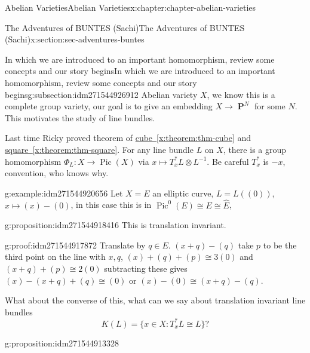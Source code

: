 \documentclass[oneside,10pt,]{book}
\numberwithin{equation}{section}
\DeclareMathOperator{\Pic}{Pic}
\DeclareMathOperator{\PP}{\mathbf{P}}
\begin{document}
\begin{chapterptx}{Abelian Varieties}{}{Abelian Varieties}{}{}{x:chapter:chapter-abelian-varieties}
\typeout{************************************************}
%
\begin{sectionptx}{The Adventures of BUNTES (Sachi)}{}{The Adventures of BUNTES (Sachi)}{}{}{x:section:sec-adventures-buntes}
%
%
\typeout{************************************************}
\typeout{************************************************}
%
\begin{subsectionptx}{In which we are introduced to an important homomorphism, review some concepts and our story begins}{}{In which we are introduced to an important homomorphism, review some concepts and our story begins}{}{}{g:subsection:idm271544926912}
Abelian variety  \(X\), we know this is a complete group variety, our goal is to give an embedding \(X\to \PP^N\) for some \(N\). This motivates the study of line bundles.%
\par
Last time Ricky proved theorem of \hyperref[x:theorem:thm-cube]{cube~\ref{x:theorem:thm-cube}} and \hyperref[x:theorem:thm-square]{square~\ref{x:theorem:thm-square}}. For any line bundle  \(L\) on \(X\), there is a group homomorphism \(\Phi_L\colon X \to \Pic(X)\) via \(x\mapsto T_x^* L\otimes L^{-1}\). Be careful \(T_x^*\) is \(-x\), convention, who knows why.%
\begin{example}{}{g:example:idm271544920656}%
Let \(X =E\) an elliptic curve, \(L = L((0))\), \(x\mapsto (x) - (0)\), in this case this is in \(\Pic^0(E) \cong E \cong \widehat E\),%
\end{example}
\begin{proposition}{}{}{g:proposition:idm271544918416}%
This is translation invariant.%
\end{proposition}
\begin{proofptx}{}{g:proof:idm271544917872}
Translate by \(q\in E\). \((x+q) - (q)\) take \(p\) to be the third point on the line with \(x,q\), \((x) + (q) + (p) \cong 3(0)\) and \((x+q) + (p) \cong 2 (0)\) subtracting these gives \((x) - (x+q) +(q) \cong (0)\) or \((x) - (0) \cong (x+q) -(q)\).%
\end{proofptx}
What about the converse of this, what can we say about translation invariant line bundles%
\begin{equation*}
K(L) = \{x\in X : T_x^* L \cong L\}\text{?}
\end{equation*}
%
\begin{proposition}{}{}{g:proposition:idm271544913328}%

\end{proposition}
\end{subsectionptx}
\end{sectionptx}
\end{chapterptx}
\end{document}
